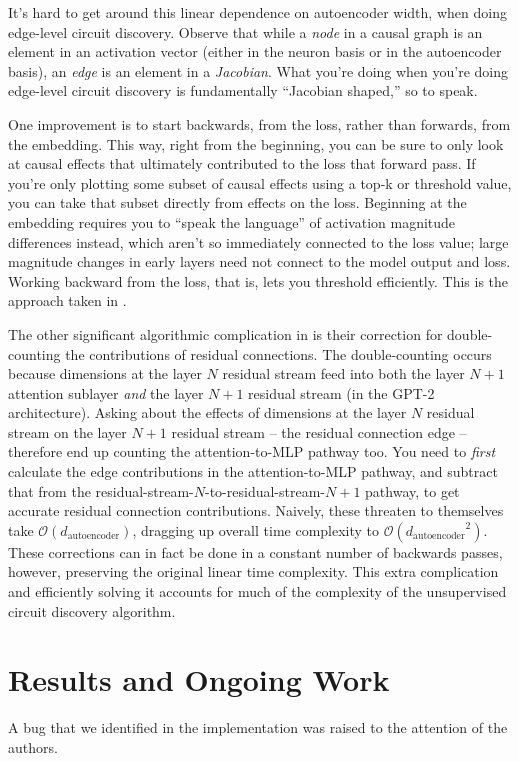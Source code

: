 \documentclass[10pt]{article}
\begin{document}
It's hard to get around this linear dependence on autoencoder width, when doing edge-level circuit discovery. Observe that while a \textit{node} in a causal graph is an element in an activation vector (either in the neuron basis or in the autoencoder basis), an \textit{edge} is an element in a \textit{Jacobian}. What you're doing when you're doing edge-level circuit discovery is fundamentally ``Jacobian shaped,'' so to speak.

One improvement is to start backwards, from the loss, rather than forwards, from the embedding. This way, right from the beginning, you can be sure to only look at causal effects that ultimately contributed to the loss that forward pass. If you're only plotting some subset of causal effects using a top-k or threshold value, you can take that subset directly from effects on the loss. Beginning at the embedding requires you to ``speak the language'' of activation magnitude differences instead, which aren't so immediately connected to the loss value; large magnitude changes in early layers need not connect to the model output and loss. Working backward from the loss, that is, lets you threshold efficiently. This is the approach taken in \citet{Marks2024}.

The other significant algorithmic complication in \citet{Marks2024} is their correction for double-counting the contributions of residual connections. The double-counting occurs because dimensions at the layer $N$ residual stream feed into both the layer $N+1$ attention sublayer \textit{and} the layer $N+1$ residual stream (in the GPT-2 architecture). Asking about the effects of dimensions at the layer $N$ residual stream on the layer $N+1$ residual stream -- the residual connection edge -- therefore end up counting the attention-to-MLP pathway too. You need to \textit{first} calculate the edge contributions in the attention-to-MLP pathway, and subtract that from the residual-stream-$N$-to-residual-stream-$N+1$ pathway, to get accurate residual connection contributions. Naively, these threaten to themselves take $\mathcal{O}(d_\text{autoencoder})$, dragging up overall time complexity to $\mathcal{O}({d_\text{autoencoder}}^2)$. These corrections can in fact be done in a constant number of backwards passes, however, preserving the original linear time complexity. This extra complication and efficiently solving it accounts for much of the complexity of the unsupervised circuit discovery algorithm.

\section{Results and Ongoing Work}
A bug that we identified in the \citet{Marks2024} implementation was raised to the attention of the authors.
\end{document}

